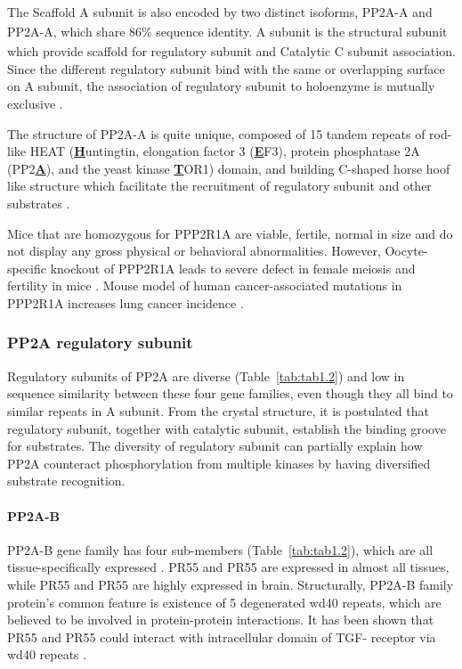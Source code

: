The Scaffold A subunit is also encoded by two distinct isoforms, PP2A-A\textsubscript{\textalpha} and PP2A-A\textsubscript{\textbeta}, which share 86\% sequence identity. A subunit is the structural subunit which provide scaffold for regulatory subunit and Catalytic C subunit association. Since the different regulatory subunit bind with the same or overlapping surface on A subunit, the association of regulatory subunit to holoenzyme is mutually exclusive \cite{cho_crystal_2007,ruediger_molecular_1994}. 

The structure of PP2A-A is quite unique, composed of 15 tandem repeats of rod-like HEAT (\textbf{\underline{H}}untingtin, elongation factor 3 (\textbf{\underline{E}}F3), protein phosphatase 2A (PP2\textbf{\underline{A}}), and the yeast kinase \textbf{\underline{T}}OR1) domain, and building C-shaped horse hoof like structure which facilitate the recruitment of regulatory subunit and other substrates \cite{cho_crystal_2007}.

Mice that are homozygous for PPP2R1A are viable, fertile, normal in size and do not display any gross physical or behavioral abnormalities. However, Oocyte-specific knockout of PPP2R1A leads to severe defect in female meiosis and fertility in mice \cite{hu_scaffold_2014}. Mouse model of human cancer-associated mutations in PPP2R1A increases lung cancer incidence \cite{ruediger_human_2011}.

\subsubsection{PP2A regulatory subunit}

Regulatory subunits of PP2A are diverse (Table~\ref{tab:tab1.2}) and low in sequence similarity between these four gene families, even though they all bind to similar repeats in A subunit. From the crystal structure, it is postulated that regulatory subunit, together with catalytic subunit, establish the binding groove for substrates. The diversity of regulatory subunit can partially explain how PP2A counteract phosphorylation from multiple kinases by having diversified substrate recognition. 


\paragraph{PP2A-B}

PP2A-B gene family has four sub-members (Table~\ref{tab:tab1.2}), which are all tissue-specifically expressed \cite{janssens_protein_2001}. PR55\textalpha{} and PR55\textdelta{} are expressed in almost all tissues, while PR55\textbeta{} and PR55\textgamma{} are highly expressed in brain. Structurally, PP2A-B family protein's common feature is existence of 5 degenerated \gls{wd40} repeats, which are believed to be involved in protein-protein interactions. It has been shown that PR55\textalpha{} and PR55\textbeta{} could interact with intracellular domain of TGF-\textbeta{} receptor via \gls{wd40} repeats \cite{griswold-prenner_physical_1998}.


